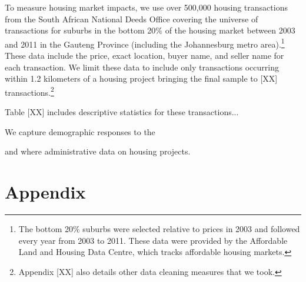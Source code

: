 \documentclass[12pt]{article}
\begin{document}
To measure housing market impacts, we use over 500,000 housing transactions from the South African National Deeds Office covering the universe of transactions for suburbs in the bottom 20\% of the housing market between 2003 and 2011 in the Gauteng Province (including the Johannesburg metro area).\footnote{The bottom 20\% suburbs were selected relative to prices in 2003 and followed every year from 2003 to 2011.  These data were provided by the Affordable Land and Housing Data Centre, which tracks affordable housing markets.}  These data include the price, exact location, buyer name, and seller name for each transaction.  We limit these data to include only transactions occurring within 1.2 kilometers of a housing project bringing the final sample to [XX] transactions.\footnote{Appendix [XX] also details other data cleaning measures that we took.}

Table [XX] includes descriptive statistics for these transactions...

We capture demographic responses to the 



and where administrative data on housing projects.  




{}
\nocite{*}
\singlespacing
\setlength\bibsep{0pt}








\appendix
\doublespacing

\section*{Appendix}
\end{document}
